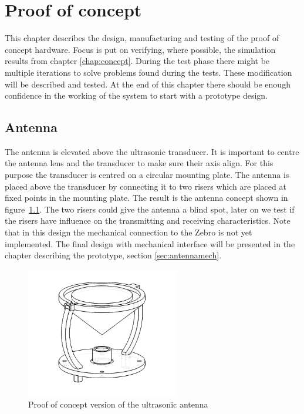 \chapter{Proof of concept}

This chapter describes the design, manufacturing and testing of the proof of concept hardware.
Focus is put on verifying, where possible, the simulation results from chapter \ref{chap:concept}.
During the test phase there might be multiple iterations to solve problems found during the tests.
These modification will be described and tested.
At the end of this chapter there should be enough confidence in the working of the system to start with a prototype design.

\section{Antenna}
\label{sec:antenna_proof}

The antenna is elevated above the ultrasonic transducer. It is important to centre the antenna lens and the transducer to make sure their axis align. For this purpose the transducer is centred on a circular mounting plate. The antenna is placed above the transducer by connecting it to two risers which are placed at fixed points in the mounting plate. The result is the antenna concept shown in figure~\ref{fig:proto_ant}. The two risers could give the antenna a blind spot, later on we test if the risers have influence on the transmitting and receiving characteristics.
  Note that in this design the mechanical connection to the Zebro is not yet implemented. The final design with mechanical interface will be presented in the chapter describing the prototype, section \ref{sec:antennamech}.

\begin{figure}[H]
\centering
\includegraphics[width=0.6\textwidth]{Figures/proto_ant.PNG}
\caption{Proof of concept version of the ultrasonic antenna}\label{fig:proto_ant}
\end{figure}

